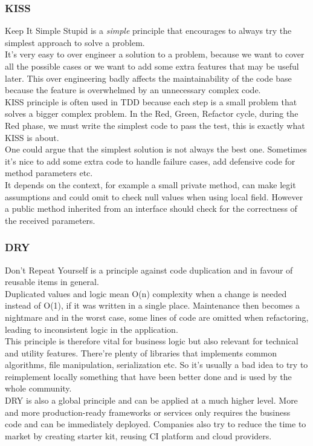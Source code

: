 \subsubsection{KISS}
Keep It Simple Stupid is a \textit{simple} principle that encourages to
always try the simplest approach to solve a problem. \\
\newline
It's very easy to over engineer a solution to a problem, because we want
to cover all the possible cases or we want to add some extra
features that may be useful later.
This over engineering badly affects the maintainability of the code base
because the feature is overwhelmed by an unnecessary complex code. \\
\newline
KISS principle is often used in TDD because each step is a small
problem that solves a bigger complex problem.
In the Red, Green, Refactor cycle, during the Red phase, we must write
the simplest code to pass the test, this is exactly what KISS is about.
\\
\newline
One could argue that the simplest solution is not always the best one.
Sometimes it's nice to add some extra code to handle failure cases, add
defensive code for method parameters etc. \\
It depends on the context, for example a small private method, can make
legit assumptions and could omit to check null values when using
local field.
However a public method inherited from an interface should check for the
correctness of the received parameters.

\subsubsection{DRY}
Don't Repeat Yourself is a principle against code duplication and in
favour of reusable items in general. \\
\newline
Duplicated values and logic mean O(n) complexity when a change is needed
instead of O(1), if it was written in a single place.
Maintenance then becomes a nightmare and in the worst case, some lines of
code are omitted when refactoring, leading to inconsistent logic in the
application. \\
\newline
This principle is therefore vital for business logic but also relevant
for technical and utility features.
There're plenty of libraries that implements common algorithms, file
manipulation, serialization etc.
So it's usually a bad idea to try to reimplement locally something that
have been better done and is used by the whole community. \\
\newline
DRY is also a global principle and can be applied at a much higher level.
More and more production-ready frameworks or services only requires
the business code and can be immediately deployed.
Companies also try to reduce the time to market by creating starter kit,
reusing CI platform and cloud providers.


